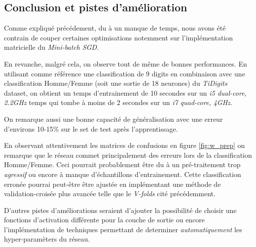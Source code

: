 \documentclass[11pt]{article}
\begin{document}
\subsection{Conclusion et pistes d'am\'elioration}
Comme expliqu\'e pr\'ec\'edement, du \`a un manque de temps, nous avons
\'et\'e contrain de couper certaines optimisations notemment sur
l'impl\'ementation matricielle du {\em Mini-batch SGD}.

En revanche, malgr\'e cela, on observe tout de m\^eme de bonnes performances.
En utilisant comme r\'ef\'erence une classification de 9 digits en combinaison
avec une classification Homme/Femme (soit une sortie de 18 neurones) du
{\em TiDigits} dataset, on obtient un temps d'entrainement de 10 secondes sur un
{\em i5 dual-core, 2.2GHz} temps qui tombe \`a moins de 2 secondes sur un
{\em i7 quad-core, 4GHz}. 

On remarque aussi une bonne capacit\'e de g\'en\'eralisation avec une erreur
d'environs 10-15\% sur le set de test apr\`es l'apprentissage.

En observant attentivement les matrices de
confusions en figure \ref{fig:w_prep} on remarque que le r\'eseau commet
principalement des erreurs lors de la classification Homme/Femme. Ceci pourrait
probablement \^etre du \`a un pr\'e-traitement trop {\em agressif} ou encore \`a
manque d'\'echantillons d'entrainement. Cette classification erron\'ee pourrai
peut-\^etre \^etre ajust\'ee en impl\'ementant une m\'ethode de
validation-crois\'ee plus avanc\'ee telle que le {\em V-folds} cit\'e pr\'ec\'edemment.

D'autres pistes d'am\'eliorations seraient d'ajouter la possibilit\'e de choisir une
fonctions d'activation diff\'erente pour la couche de sortie ou encore
l'impl\'ementation de techniques permettant de determiner {\em automatiquement}
les hyper-param\`eters du r\'eseau.


\newpage
\appendix
\end{document}
